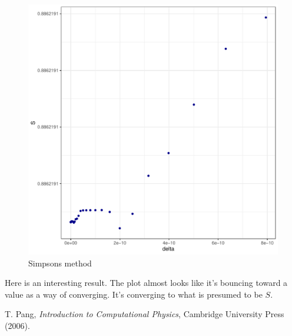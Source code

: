 \documentclass[prb,twocolumn]{revtex4-2}
\begin{document}
\begin{figure}[h!]
\centerline{\includegraphics [width=3 in] {simpsons_adapt}} \caption{Simpsons method} \label{simpsons_adapt}
\end{figure}

Here is an interesting result. The plot almost looks like it's bouncing toward a value as a way of converging. It's converging to what is presumed to be $S$.

\begin{thebibliography}{99}

 T. Pang, \emph{Introduction to Computational Physics}, Cambridge University Press (2006).

\end{thebibliography}
\end{document}

